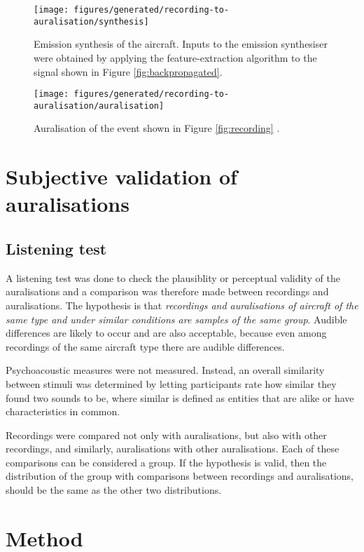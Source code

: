 \documentclass[10pt,twocolumn]{article}
\begin{document}
\begin{figure}[H]
  \centering
  \texttt{[image: figures/generated/recording-to-auralisation/synthesis]}
  \caption{Emission synthesis of the aircraft. Inputs to the emission synthesiser were obtained by applying the feature-extraction algorithm to the signal shown in Figure \ref{fig:backpropagated}.}
  \label{fig:synthesis}
\end{figure}


\begin{figure}[H]
  \centering
  \texttt{[image: figures/generated/recording-to-auralisation/auralisation]}
  \caption{Auralisation of the event shown in Figure \ref{fig:recording} .
  }
  \label{fig:auralisation}
\end{figure}


\section{Subjective validation of auralisations}

\subsection{Listening test}
A listening test was done to check the plausiblity or perceptual validity of the
auralisations and a comparison was therefore made between recordings and
auralisations.
The hypothesis is that \emph{recordings and auralisations of aircraft of the same
type and under similar conditions are samples of the same group}.
Audible differences are likely to occur and are also acceptable, because even
among recordings of the same aircraft type there are audible differences.

Psychoacoustic measures were not measured. Instead, an overall similarity
between stimuli was determined by letting participants rate how similar they
found two sounds to be, where similar is defined as entities that are alike or
have characteristics in common.

Recordings were compared not only with auralisations,
but also with other recordings, and similarly, auralisations with other
auralisations. Each of these comparisons can be considered a group. If the
hypothesis is valid, then the distribution of the group with comparisons between
recordings and auralisations, should be the same as the other two distributions.

\section{Method}
\end{document}
